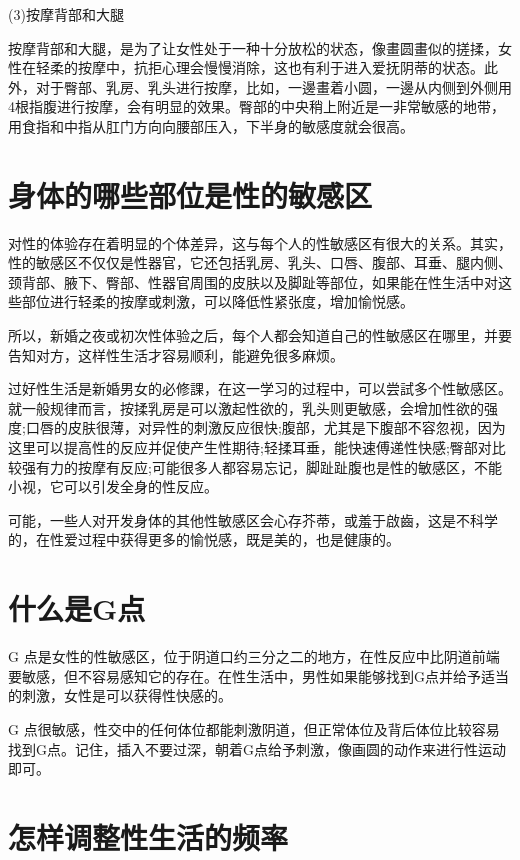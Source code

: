 \documentclass[12pt,UTF8]{ctexbook}
\begin{document}
(3)按摩背部和大腿

按摩背部和大腿，是为了让女性处于一种十分放松的状态，像畫圆畫似的搓揉，女性在轻柔的按摩中，抗拒心理会慢慢消除，这也有利于进入爱抚阴蒂的状态。此外，对于臀部、乳房、乳头进行按摩，比如，一邊畫着小圆，一邊从内侧到外侧用4根指腹进行按摩，会有明显的效果。臀部的中央稍上附近是一非常敏感的地带，用食指和中指从肛门方向向腰部压入，下半身的敏感度就会很高。

\section{身体的哪些部位是性的敏感区}

对性的体验存在着明显的个体差异，这与每个人的性敏感区有很大的关系。其实，性的敏感区不仅仅是性器官，它还包括乳房、乳头、口唇、腹部、耳垂、腿内侧、颈背部、腋下、臀部、性器官周围的皮肤以及脚趾等部位，如果能在性生活中对这些部位进行轻柔的按摩或刺激，可以降低性紧张度，增加愉悦感。

所以，新婚之夜或初次性体验之后，每个人都会知道自己的性敏感区在哪里，并要告知对方，这样性生活才容易顺利，能避免很多麻烦。

过好性生活是新婚男女的必修課，在这一学习的过程中，可以尝試多个性敏感区。就一般规律而言，按揉乳房是可以激起性欲的，乳头则更敏感，会增加性欲的强度;口唇的皮肤很薄，对异性的刺激反应很快;腹部，尤其是下腹部不容忽视，因为这里可以提高性的反应并促使产生性期待;轻揉耳垂，能快速傅递性快感;臀部对比较强有力的按摩有反应;可能很多人都容易忘记，脚趾趾腹也是性的敏感区，不能小视，它可以引发全身的性反应。

可能，一些人对开发身体的其他性敏感区会心存芥蒂，或羞于啟齒，这是不科学的，在性爱过程中获得更多的愉悦感，既是美的，也是健康的。

\section{什么是G点}

G 点是女性的性敏感区，位于阴道口约三分之二的地方，在性反应中比阴道前端要敏感，但不容易感知它的存在。在性生活中，男性如果能够找到G点并给予适当的刺激，女性是可以获得性快感的。

G 点很敏感，性交中的任何体位都能刺激阴道，但正常体位及背后体位比较容易找到G点。记住，插入不要过深，朝着G点给予刺激，像画圆的动作来进行性运动即可。

\section{怎样调整性生活的频率}
\end{document}
